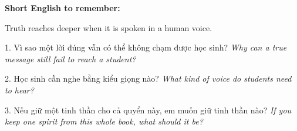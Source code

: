 \begin{ghinhoanh}
\textbf{Short English to remember:}

Truth reaches deeper when it is spoken in a human voice.

\end{ghinhoanh}

\begin{tuhocnhanh}
1. Vì sao một lời đúng vẫn có thể không chạm được học sinh? \textit{Why can a true message still fail to reach a student?}

2. Học sinh cần nghe bằng kiểu giọng nào? \textit{What kind of voice do students need to hear?}

3. Nếu giữ một tinh thần cho cả quyển này, em muốn giữ tinh thần nào? \textit{If you keep one spirit from this whole book, what should it be?}
\end{tuhocnhanh}

\ngancach
